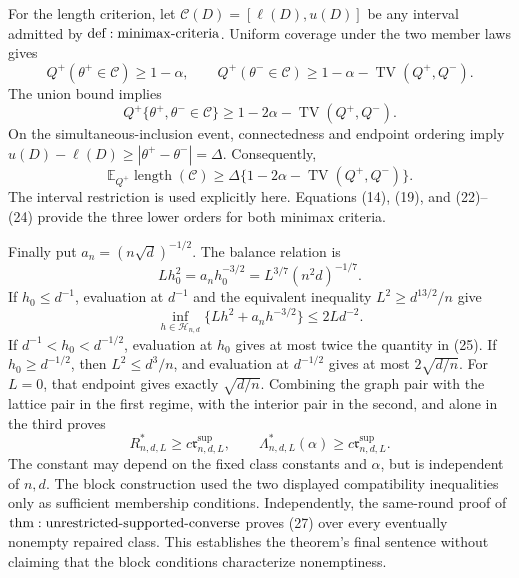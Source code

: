 For the length criterion, let \(\mathcal C(D)=[\ell(D),u(D)]\) be any interval admitted by \({\rm def:minimax\text{-}criteria}\).  Uniform coverage under the two member laws gives
\[
 Q^+(\theta^+\in\mathcal C)\geq1-\alpha,
 \qquad
 Q^+(\theta^-\in\mathcal C)
 \geq1-\alpha-\operatorname{TV}(Q^+,Q^-).
\]
The union bound implies
\[
 Q^+\{\theta^+,\theta^-\in\mathcal C\}
 \geq1-2\alpha-\operatorname{TV}(Q^+,Q^-).
\]
On the simultaneous-inclusion event, connectedness and endpoint ordering imply \(u(D)-\ell(D)\geq|\theta^+-\theta^-|=\Delta\).  Consequently,
\[
 \mathbb E_{Q^+}\operatorname{length}(\mathcal C)
 \geq\Delta\{1-2\alpha-\operatorname{TV}(Q^+,Q^-)\}.
\tag{24}
\]
The interval restriction is used explicitly here.  Equations (14), (19), and (22)--(24) provide the three lower orders for both minimax criteria.

Finally put \(a_n=(n\sqrt d)^{-1/2}\).  The balance relation is
\[
 Lh_0^2=a_nh_0^{-3/2}=L^{3/7}(n^2d)^{-1/7}.
\tag{25}
\]
If \(h_0\leq d^{-1}\), evaluation at \(d^{-1}\) and the equivalent inequality \(L^2\geq d^{13/2}/n\) give
\[
 \inf_{h\in\mathcal H_{n,d}}
 \{Lh^2+a_nh^{-3/2}\}\leq2Ld^{-2}.
\tag{26}
\]
If \(d^{-1}<h_0<d^{-1/2}\), evaluation at \(h_0\) gives at most twice the quantity in (25).  If \(h_0\geq d^{-1/2}\), then \(L^2\leq d^3/n\), and evaluation at \(d^{-1/2}\) gives at most \(2\sqrt{d/n}\).  For \(L=0\), that endpoint gives exactly \(\sqrt{d/n}\).  Combining the graph pair with the lattice pair in the first regime, with the interior pair in the second, and alone in the third proves
\[
 R^*_{n,d,L}\geq c\mathfrak r^{\mathrm{sup}}_{n,d,L},
 \qquad
 \Lambda^*_{n,d,L}(\alpha)
 \geq c\mathfrak r^{\mathrm{sup}}_{n,d,L}.
\tag{27}
\]
The constant may depend on the fixed class constants and \(\alpha\), but is independent of \(n,d\).  The block construction used the two displayed compatibility inequalities only as sufficient membership conditions.  Independently, the same-round proof of \({\rm thm:unrestricted\text{-}supported\text{-}converse}\) proves (27) over every eventually nonempty repaired class.  This establishes the theorem's final sentence without claiming that the block conditions characterize nonemptiness.